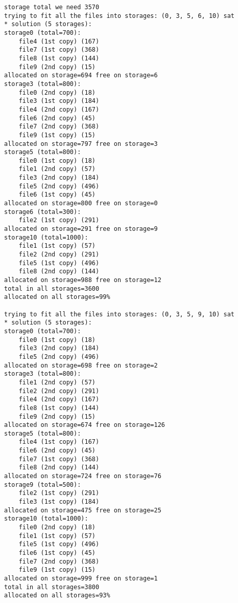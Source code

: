 \begin{lstlisting}
storage total we need 3570
trying to fit all the files into storages: (0, 3, 5, 6, 10) sat
* solution (5 storages):
storage0 (total=700):
    file4 (1st copy) (167)
    file7 (1st copy) (368)
    file8 (1st copy) (144)
    file9 (2nd copy) (15)
allocated on storage=694 free on storage=6
storage3 (total=800):
    file0 (2nd copy) (18)
    file3 (1st copy) (184)
    file4 (2nd copy) (167)
    file6 (2nd copy) (45)
    file7 (2nd copy) (368)
    file9 (1st copy) (15)
allocated on storage=797 free on storage=3
storage5 (total=800):
    file0 (1st copy) (18)
    file1 (2nd copy) (57)
    file3 (2nd copy) (184)
    file5 (2nd copy) (496)
    file6 (1st copy) (45)
allocated on storage=800 free on storage=0
storage6 (total=300):
    file2 (1st copy) (291)
allocated on storage=291 free on storage=9
storage10 (total=1000):
    file1 (1st copy) (57)
    file2 (2nd copy) (291)
    file5 (1st copy) (496)
    file8 (2nd copy) (144)
allocated on storage=988 free on storage=12
total in all storages=3600
allocated on all storages=99%

trying to fit all the files into storages: (0, 3, 5, 9, 10) sat
* solution (5 storages):
storage0 (total=700):
    file0 (1st copy) (18)
    file3 (2nd copy) (184)
    file5 (2nd copy) (496)
allocated on storage=698 free on storage=2
storage3 (total=800):
    file1 (2nd copy) (57)
    file2 (2nd copy) (291)
    file4 (2nd copy) (167)
    file8 (1st copy) (144)
    file9 (2nd copy) (15)
allocated on storage=674 free on storage=126
storage5 (total=800):
    file4 (1st copy) (167)
    file6 (2nd copy) (45)
    file7 (1st copy) (368)
    file8 (2nd copy) (144)
allocated on storage=724 free on storage=76
storage9 (total=500):
    file2 (1st copy) (291)
    file3 (1st copy) (184)
allocated on storage=475 free on storage=25
storage10 (total=1000):
    file0 (2nd copy) (18)
    file1 (1st copy) (57)
    file5 (1st copy) (496)
    file6 (1st copy) (45)
    file7 (2nd copy) (368)
    file9 (1st copy) (15)
allocated on storage=999 free on storage=1
total in all storages=3800
allocated on all storages=93%
\end{lstlisting}

